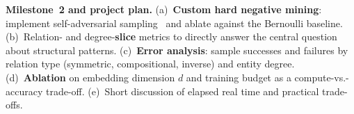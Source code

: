 \documentclass[10pt,a4paper]{article}
\begin{document}
\textbf{Milestone~2 and project plan.} (a)~\textbf{Custom hard negative mining}: implement self-adversarial sampling~\citep{sun2019rotate} and ablate against the Bernoulli baseline. (b)~Relation- and degree-\textbf{slice} metrics to directly answer the central question about structural patterns. (c)~\textbf{Error analysis}: sample successes and failures by relation type (symmetric, compositional, inverse) and entity degree. (d)~\textbf{Ablation} on embedding dimension $d$ and training budget as a compute-vs.-accuracy trade-off. (e)~Short discussion of elapsed real time and practical trade-offs.

\footnotesize


\end{document}
